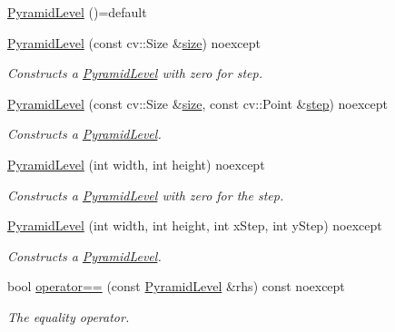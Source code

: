 \begin{DoxyCompactItemize}
\item 
\hyperlink{structdg_1_1deepcore_1_1imagery_1_1_pyramid_level_a02d5500ac1f4fb61166b089b21fbe224}{Pyramid\+Level} ()=default
\item 
\hyperlink{group___imagery_module_ga64dc65f27bed7bb4888bc0375eb9d99a}{Pyramid\+Level} (const cv\+::\+Size \&\hyperlink{structdg_1_1deepcore_1_1imagery_1_1_pyramid_level_a75e0034ad50a997202c7e31f3bdc0aed}{size}) noexcept
\begin{DoxyCompactList}\small\item\em Constructs a \hyperlink{structdg_1_1deepcore_1_1imagery_1_1_pyramid_level}{Pyramid\+Level} with zero for step. \end{DoxyCompactList}\item 
\hyperlink{group___imagery_module_gab23e577c28dd7a700976dc26cef3db76}{Pyramid\+Level} (const cv\+::\+Size \&\hyperlink{structdg_1_1deepcore_1_1imagery_1_1_pyramid_level_a75e0034ad50a997202c7e31f3bdc0aed}{size}, const cv\+::\+Point \&\hyperlink{structdg_1_1deepcore_1_1imagery_1_1_pyramid_level_a713f44d063951b9ca53cc7d76f65f718}{step}) noexcept
\begin{DoxyCompactList}\small\item\em Constructs a \hyperlink{structdg_1_1deepcore_1_1imagery_1_1_pyramid_level}{Pyramid\+Level}. \end{DoxyCompactList}\item 
\hyperlink{group___imagery_module_ga9675c2d85800ca99ea908f26996dbcc1}{Pyramid\+Level} (int width, int height) noexcept
\begin{DoxyCompactList}\small\item\em Constructs a \hyperlink{structdg_1_1deepcore_1_1imagery_1_1_pyramid_level}{Pyramid\+Level} with zero for the step. \end{DoxyCompactList}\item 
\hyperlink{group___imagery_module_ga6e5a71cc3c52efc7890ebb8d2151b35d}{Pyramid\+Level} (int width, int height, int x\+Step, int y\+Step) noexcept
\begin{DoxyCompactList}\small\item\em Constructs a \hyperlink{structdg_1_1deepcore_1_1imagery_1_1_pyramid_level}{Pyramid\+Level}. \end{DoxyCompactList}\item 
bool \hyperlink{group___imagery_module_ga4195fc5c6eb71435e4aa06165bbb6f36}{operator==} (const \hyperlink{structdg_1_1deepcore_1_1imagery_1_1_pyramid_level}{Pyramid\+Level} \&rhs) const noexcept
\begin{DoxyCompactList}\small\item\em The equality operator. \end{DoxyCompactList}\end{DoxyCompactItemize}
